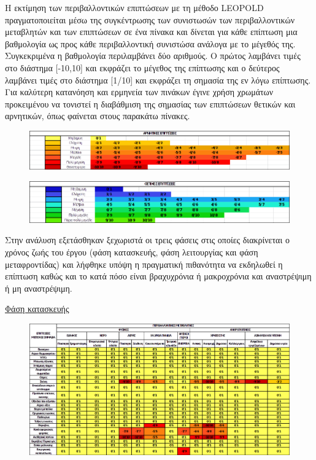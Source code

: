 \documentclass[12pt]{article}
\newcommand{\gr}{\selectlanguage{greek}}
\newcommand{\eng}{\selectlanguage{english}}
\begin{document}
 	Η εκτίμηση των περιβαλλοντικών επιπτώσεων με τη μέθοδο \eng LEOPOLD \gr πραγματοποιείται μέσω της συγκέντρωσης των συνιστωσών των περιβαλλοντικών μεταβλητών και των επιπτώσεων σε ένα πίνακα και δίνεται για κάθε επίπτωση μια βαθμολογία ως προς κάθε περιβαλλοντική συνιστώσα ανάλογα με το μέγεθός της. Συγκεκριμένα η βαθμολογία περιλαμβάνει δύο αριθμούς. Ο πρώτος λαμβάνει τιμές στο διάστημα [-10,10] και εκφράζει το μέγεθος της επίπτωσης και ο δεύτερος λαμβάνει τιμές στο διάστημα [1/10] και εκφράζει τη σημασία της εν λόγω επίπτωσης. Για καλύτερη κατανόηση και ερμηνεία των πινάκων έγινε χρήση χρωμάτων προκειμένου να τονιστεί η διαβάθμιση της σημασίας των επιπτώσεων θετικών και αρνητικών, όπως φαίνεται στους παρακάτω πίνακες. 
 	
 	\begin{figure} [H]
 		\begin{center}
 			\includegraphics [scale = 0.60] {table34.png}
 		\end{center}
 	\end{figure}
 
 	\begin{figure} [H]
 		\begin{center}
 			\includegraphics [scale = 0.65] {table35.png}
 		\end{center}
 	\end{figure}
 
 	Στην ανάλυση εξετάσθηκαν ξεχωριστά οι τρεις φάσεις στις οποίες διακρίνεται ο χρόνος ζωής του έργου (φάση κατασκευής, φάση λειτουργίας και φάση μεταφροντίδας) και λήφθηκε υπόψη η πραγματική πιθανότητα να εκδηλωθεί η επίπτωση καθώς και το κατά πόσο είναι βραχυχρόνια ή μακροχρόνια και αναστρέψιμη ή μη αναστρέψιμη.
 	
 	\underline{Φάση κατασκευής}
 	
 	\begin{figure} [H]
 		\begin{center}
 			\includegraphics [scale = 0.60] {table36.png}
 		\end{center}
 	\end{figure}
 
\end{document}
